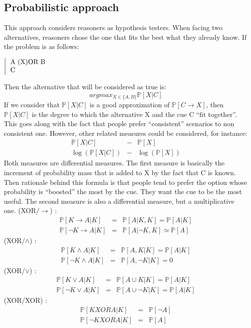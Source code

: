 \documentclass[french]{article}
\begin{document}
\subsection{Probabilistic approach}
This approach considers reasoners as hypothesis testers. When facing two alternatives, reasoners chose the one that fits the best what they already know. If the problem is as follows:
\begin{center}
	$\left |\begin{tabular}{l}
	A (X)OR B\\
	C
\end{tabular}\right.$
\end{center}
Then the alternative that will be considered as true is:
\begin{equation*}
argmax_{X \in \lbrace A, B \rbrace} \mathbb{P}[X|C]
\end{equation*}
If we consider that $\mathbb{P}[X|C]$ is a good approximation of $\mathbb{P}[C\rightarrow X]$, then $\mathbb{P}[X|C]$ is the degree to which the alternative X and the cue C ``fit together''. This goes along with the fact that people prefer ``consistent'' scenarios to non consistent one. However, other related measures could be considered, for instance:
\begin{eqnarray*}
\mathbb{P}[X|C] &-& \mathbb{P}[X]\\
\log(\mathbb{P}[X|C]) &-& \log(\mathbb{P}[X])
\end{eqnarray*}
Both measures are differential measures. The first measure is basically the increment of probability mass that is added to X by the fact that C is known. Then rationale behind this formula is that people tend to prefer the option whose probability is ``boosted'' the most by the cue. They want the cue to be the most useful. The second measure is also a differential measure, but a multiplicative one.
(XOR/$\rightarrow$) : \\
\begin{eqnarray*}
\mathbb{P}[K \rightarrow A|K] &=& \mathbb{P}[A|K, K] = \mathbb{P}[A|K]\\
\mathbb{P}[\neg K \rightarrow A|K] &=& \mathbb{P}[A|\neg K, K] \simeq \mathbb{P}[A]
\end{eqnarray*}
(XOR/$\wedge$) : \\
\begin{eqnarray*}
\mathbb{P}[K \wedge A|K] &=& \mathbb{P}[A, K|K] = \mathbb{P}[A|K]\\
\mathbb{P}[\neg K \wedge A|K] &=& \mathbb{P}[A, \neg K| K] = 0
\end{eqnarray*}
(XOR/$\vee$) : \\
\begin{eqnarray*}
\mathbb{P}[K \vee A|K] &=& \mathbb{P}[A \cup K|K] = \mathbb{P}[A|K]\\
\mathbb{P}[\neg K \vee A|K] &=& \mathbb{P}[A \cup \neg K| K] = \mathbb{P}[A|K]
\end{eqnarray*}
(XOR/XOR) : \\
\begin{eqnarray*}
\mathbb{P}[K XOR A|K] &=& \mathbb{P}[\neg A]\\
\mathbb{P}[\neg K XOR A|K] &=& \mathbb{P}[A]
\end{eqnarray*}
\end{document}
